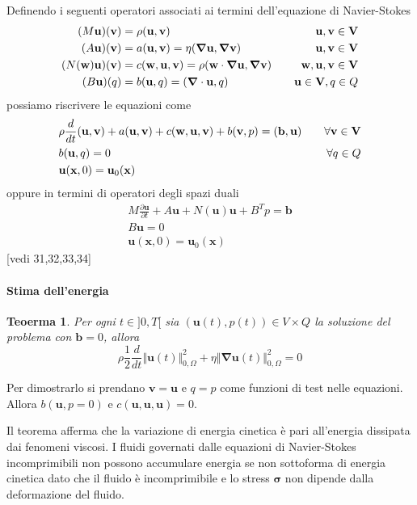 \documentclass{book}
\newtheorem{theorem}{Teoerma}[section]
\newenvironment{proof}[1][Dimostrazione]{\begin{trivlist}
\item[\hskip \labelsep {\bfseries #1}]}{\end{trivlist}}
\newcommand{\Nabla}{\boldsymbol{\nabla}}
\begin{document}
Definendo i seguenti operatori associati ai termini dell'equazione di Navier-Stokes
\begin{equation}
\begin{aligned}
(M\mathbf{u})(\mathbf{v})&=\rho\ps{\mathbf{u}}{\mathbf{v}} \quad &\mathbf{u},\mathbf{v}\in \mathbf{V}\\
(A\mathbf{u})(\mathbf{v})&=a(\mathbf{u},\mathbf{v})=\eta\ps{\Nabla\mathbf{u}}{\Nabla\mathbf{v}} \quad &\mathbf{u},\mathbf{v}\in \mathbf{V}\\
(N(\mathbf{w})\mathbf{u})(\mathbf{v})&=c(\mathbf{w},\mathbf{u},\mathbf{v})=\rho\ps{\mathbf{w}\cdot\Nabla\mathbf{u}}{\Nabla\mathbf{v}} \quad &\mathbf{w},\mathbf{u},\mathbf{v}\in \mathbf{V}\\
(B\mathbf{u})(q)&=b(\mathbf{u},q)=\ps{\Nabla\cdot\mathbf{u}}{q} \quad &\mathbf{u}\in \mathbf{V},q\in Q
\end{aligned}
\end{equation}
possiamo riscrivere le equazioni come
\begin{equation}
\begin{aligned}
&\rho\frac{d}{dt}\ps{\mathbf{u}}{\mathbf{v}}+a(\mathbf{u},\mathbf{v})+c(\mathbf{w},\mathbf{u},\mathbf{v})+b(\mathbf{v},p)=\ps{\mathbf{b}}{\mathbf{u}} \quad &\forall\mathbf{v}\in\mathbf{V}\\
&b(\mathbf{u},q)=0 \quad &\forall q\in Q\\
&\mathbf{u}(\mathbf{x},0)=\mathbf{u}_0(\mathbf{x})&
\end{aligned}
\end{equation}
oppure in termini di operatori degli spazi duali
\begin{equation}
\begin{aligned}
&M\frac{\partial\mathbf{u}}{\partial t}+A\mathbf{u}+N(\mathbf{u})\mathbf{u}+B^{T}p=\mathbf{b}\\
&B\mathbf{u}=0\\
&\mathbf{u}(\mathbf{x},0)=\mathbf{u}_0(\mathbf{x})&
\end{aligned}
\end{equation}
[vedi 31,32,33,34]

\paragraph{Stima dell'energia}
\begin{theorem}
Per ogni $t \in ]0,T[$ sia $(\mathbf{u}(t),p(t)) \in V \times Q$ la soluzione del problema con $\mathbf{b}=0$, allora
$$\rho \frac{1}{2} \frac{d}{dt} \Vert \mathbf{u} (t) \Vert^2_{0,\Omega} + \eta \Vert \Nabla \mathbf{u} (t) \Vert^2_{0,\Omega} = 0$$
\end{theorem}
\begin{proof}
Per dimostrarlo si prendano $\mathbf{v}=\mathbf{u}$ e $q=p$ come funzioni di test nelle equazioni. Allora $b(\mathbf{u},p=0)$ e $c(\mathbf{u},\mathbf{u},\mathbf{u})=0$.
\end{proof}
Il teorema afferma che la variazione di energia cinetica è pari all'energia dissipata dai fenomeni viscosi.
I fluidi governati dalle equazioni di Navier-Stokes incomprimibili non possono accumulare energia se non sottoforma di energia cinetica dato che il fluido è incomprimibile e lo stress $\boldsymbol{\sigma}$ non dipende dalla deformazione del fluido. 
\end{document}
